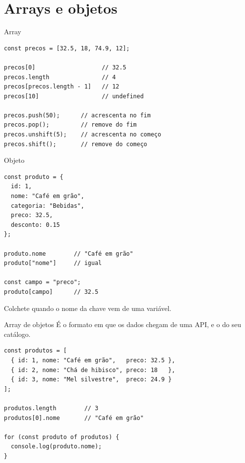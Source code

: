\documentclass{beamer}
\begin{document}
\section{Arrays e objetos}

\begin{frame}[fragile]{Array}
	\begin{verbatim}
const precos = [32.5, 18, 74.9, 12];

precos[0]                   // 32.5
precos.length               // 4
precos[precos.length - 1]   // 12
precos[10]                  // undefined

precos.push(50);      // acrescenta no fim
precos.pop();         // remove do fim
precos.unshift(5);    // acrescenta no começo
precos.shift();       // remove do começo
	\end{verbatim}
\end{frame}

\begin{frame}[fragile]{Objeto}
	\begin{verbatim}
const produto = {
  id: 1,
  nome: "Café em grão",
  categoria: "Bebidas",
  preco: 32.5,
  desconto: 0.15
};

produto.nome        // "Café em grão"
produto["nome"]     // igual

const campo = "preco";
produto[campo]      // 32.5
	\end{verbatim}

	\vspace{0.2cm}
	Colchete quando o nome da chave vem de uma variável.
\end{frame}

\begin{frame}[fragile]{Array de objetos}
	É o formato em que os dados chegam de uma API, e o do seu catálogo.

	\begin{verbatim}
const produtos = [
  { id: 1, nome: "Café em grão",   preco: 32.5 },
  { id: 2, nome: "Chá de hibisco", preco: 18   },
  { id: 3, nome: "Mel silvestre",  preco: 24.9 }
];

produtos.length        // 3
produtos[0].nome       // "Café em grão"

for (const produto of produtos) {
  console.log(produto.nome);
}
	\end{verbatim}
\end{frame}
\end{document}
